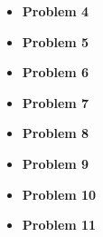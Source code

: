 \documentclass{article}
\begin{document}
\begin{itemize}
\begin{enumerate}[label=(\roman*)]
		\end{enumerate}
	\item{\textcolor{for}{\textbf{Problem 4}}}
	\item{\textcolor{for}{\textbf{Problem 5}}}
	\item{\textcolor{for}{\textbf{Problem 6}}}
	\item{\textcolor{for}{\textbf{Problem 7}}}
	\item{\textcolor{for}{\textbf{Problem 8}}}
	\item{\textcolor{for}{\textbf{Problem 9}}}
	\item{\textcolor{for}{\textbf{Problem 10}}}
	\item{\textcolor{for}{\textbf{Problem 11}}}
\end{itemize}
\end{document}
